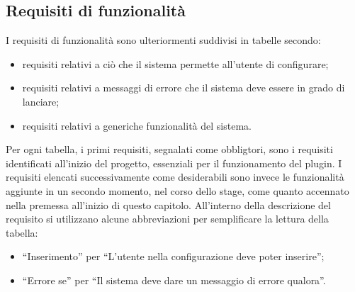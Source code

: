 
	\subsection{Requisiti di funzionalità}\label{RequisitiFunzionalità}
	I requisiti di funzionalità sono ulteriormenti suddivisi in tabelle secondo:
	\begin{itemize}
		\item requisiti relativi a ciò che il sistema permette all'utente di configurare;
		\item requisiti relativi a messaggi di errore che il sistema deve essere in grado di lanciare;
		\item requisiti relativi a generiche funzionalità del sistema.
	\end{itemize}
	Per ogni tabella, i primi requisiti, segnalati come obbligtori, sono i requisiti identificati all'inizio del progetto, essenziali per il funzionamento del plugin.
	I requisiti elencati successivamente come desiderabili sono invece le funzionalità aggiunte in un secondo momento, nel corso dello stage, come quanto accennato nella premessa all'inizio di questo capitolo.
	All'interno della descrizione del requisito si utilizzano alcune abbreviazioni per semplificare la lettura della tabella:
	\begin{itemize}
		\item ``Inserimento'' per ``L'utente nella configurazione deve poter inserire'';
		\item ``Errore se'' per ``Il sistema deve dare un messaggio di errore qualora''.
	\end{itemize}
		 

